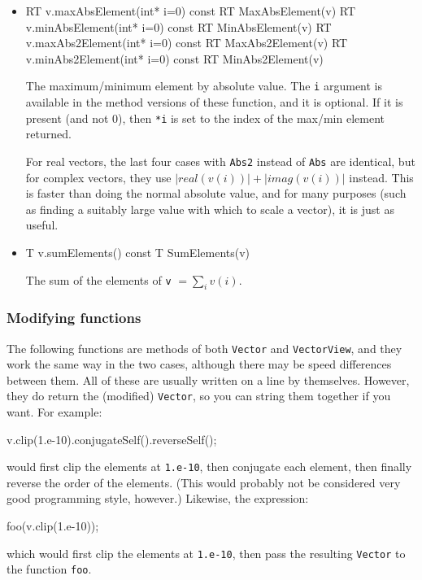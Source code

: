 \documentclass[twoside,letterpaper,11pt]{article}
\renewcommand{\tt}[1]{{\lstinline {#1}}}
\begin{document}
\begin{itemize}
\item
\begin{tmvcode}
RT v.maxAbsElement(int* i=0) const
RT MaxAbsElement(v)
RT v.minAbsElement(int* i=0) const
RT MinAbsElement(v)
RT v.maxAbs2Element(int* i=0) const
RT MaxAbs2Element(v)
RT v.minAbs2Element(int* i=0) const
RT MinAbs2Element(v)
\end{tmvcode}
The maximum/minimum element by absolute value.  
The \tt{i} argument is available in the method versions of these function, and it is optional.
If it is present (and not 0), then \tt{*i} is set to the 
index of the max/min element returned.

For real vectors, the last four cases with \tt{Abs2} instead of \tt{Abs} are identical, but 
for complex vectors, they use $|real(v(i))| + |imag(v(i))|$ instead.  This is faster than doing
the normal absolute value, and for many purposes (such as finding a suitably large value
with which to scale a vector), it is just as useful.

\item
\begin{tmvcode}
T v.sumElements() const
T SumElements(v)
\end{tmvcode}
The sum of the elements of \tt{v} $= \sum_i v(i)$.

\end{itemize}


\subsubsection{Modifying functions}

The following functions are methods of both \tt{Vector} and \tt{VectorView},
and they work the same way in the two cases, although there may be speed differences
between them.  
All of these are usually written on a line by themselves.  However, they do
return the (modified) \tt{Vector}, so you can string them together if you want.
For example:
\begin{tmvcode}
v.clip(1.e-10).conjugateSelf().reverseSelf();
\end{tmvcode}
would first clip the elements at \tt{1.e-10}, then conjugate each element, then finally reverse the
order of the elements.  (This would probably not be considered 
very good programming style, however.)
Likewise, the expression:
\begin{tmvcode}
foo(v.clip(1.e-10));
\end{tmvcode}
which would first clip the elements at \tt{1.e-10},
then pass the resulting \tt{Vector} to the function \tt{foo}.  
\end{document}
